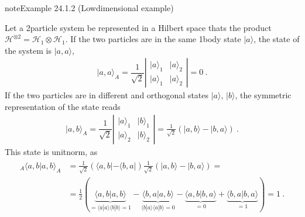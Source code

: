 \documentclass[letterpaper,10pt,english]{jupyterBook}
\begin{document}
\begin{sphinxadmonition}{note}{Example 24.1.2 (Low\sphinxhyphen{}dimensional example)}



\sphinxAtStartPar
Let a 2\sphinxhyphen{}particle system be represented in a Hilbert space thats the product \(\mathcal{H}^{\otimes 2} = \mathcal{H}_1 \otimes \mathcal{H}_1\). If the two particles are in the same 1\sphinxhyphen{}body state \(| a \rangle\), the state of the system is \(| a , a \rangle\),
\begin{equation*}
\begin{split}| a , a \rangle_A = \dfrac{1}{\sqrt{2}} \left| \begin{matrix} | a \rangle_1 & | a \rangle_2 \\ | a \rangle_1 & | a \rangle_2 \end{matrix} \right| = 0 \ .\end{split}
\end{equation*}
\sphinxAtStartPar
If the two particles are in different and orthogonal states \(| a \rangle\), \(| b \rangle\), the symmetric representation of the state reads
\begin{equation*}
\begin{split}| a , b \rangle_A = \dfrac{1}{\sqrt{2}} \left| \begin{matrix} | a \rangle_1 & | b \rangle_1 \\ | a \rangle_2 & | b \rangle_2 \end{matrix} \right| = \frac{1}{\sqrt{2}} \left( | a, b \rangle - | b, a \rangle \right) \ .\end{split}
\end{equation*}
\sphinxAtStartPar
This state is unit\sphinxhyphen{}norm, as
\begin{equation*}
\begin{split}\begin{aligned}
  {}_A \langle a , b | a, b \rangle_A 
  & = \frac{1}{\sqrt{2}} \left( \langle a , b | - \langle b , a | \right) \frac{1}{\sqrt{2}} \left( | a , b \rangle - | b , a \rangle  \right) = \\
  & = \frac{1}{2} \left( \underbrace{\langle a , b | a, b \rangle}_{=\langle a | a \rangle \langle b |b \rangle = 1} - \underbrace{\langle b , a | a, b \rangle}_{\langle b | a \rangle \langle a | b \rangle = 0} - \underbrace{\langle a , b | b, a \rangle}_{=0} + \underbrace{\langle b , a | b, a \rangle}_{=1} \right) = 1 \ .
\end{aligned}\end{split}
\end{equation*}\end{sphinxadmonition}
\end{document}

